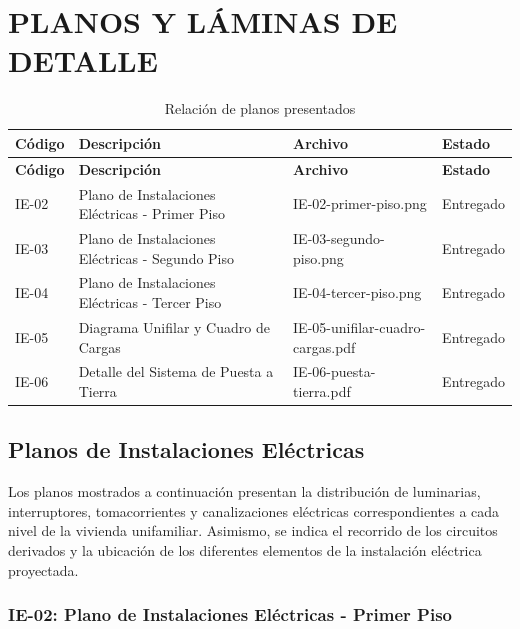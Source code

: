 
\chapter{PLANOS Y LÁMINAS DE DETALLE}

\begin{longtable}{L{1.6cm}L{5.5cm}L{4.5cm}L{2cm}}
	\caption{Relación de planos presentados}
	\label{tab:planos}\\
	
	\toprule
	\textbf{Código} & \textbf{Descripción} & \textbf{Archivo} & \textbf{Estado} \\
	\midrule
	\endfirsthead
	
	\toprule
	\textbf{Código} & \textbf{Descripción} & \textbf{Archivo} & \textbf{Estado} \\
	\midrule
	\endhead
	
	IE-02 &
	Plano de Instalaciones Eléctricas - Primer Piso &
	IE-02-primer-piso.png &
	Entregado \\
	
	IE-03 &
	Plano de Instalaciones Eléctricas - Segundo Piso &
	IE-03-segundo-piso.png &
	Entregado \\
	
	IE-04 &
	Plano de Instalaciones Eléctricas - Tercer Piso &
	IE-04-tercer-piso.png &
	Entregado \\
	
	IE-05 &
	Diagrama Unifilar y Cuadro de Cargas &
	IE-05-unifilar-cuadro-cargas.pdf &
	Entregado \\
	
	IE-06 &
	Detalle del Sistema de Puesta a Tierra &
	IE-06-puesta-tierra.pdf &
	Entregado \\
	
	\bottomrule
\end{longtable}

\section{Planos de Instalaciones Eléctricas}

Los planos mostrados a continuación presentan la distribución de luminarias, interruptores, tomacorrientes y canalizaciones eléctricas correspondientes a cada nivel de la vivienda unifamiliar. Asimismo, se indica el recorrido de los circuitos derivados y la ubicación de los diferentes elementos de la instalación eléctrica proyectada.

\subsection{IE-02: Plano de Instalaciones Eléctricas - Primer Piso}


